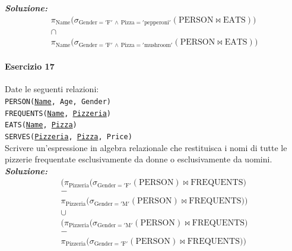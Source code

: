 \documentclass[12pt]{extarticle}
\begin{document}
\noindent \textbf{\textit{Soluzione:}}
\[
\begin{gathered}
\pi_{\text{Name}} \big( \sigma_{\text{Gender} = '\text{F}' \,\land\, \text{Pizza} = '\text{pepperoni}'}(\text{PERSON} \bowtie \text{EATS}) \big) \\
\cap \\
\pi_{\text{Name}} \big( \sigma_{\text{Gender} = '\text{F}' \,\land\, \text{Pizza} = '\text{mushroom}'}(\text{PERSON} \bowtie \text{EATS}) \big)
\end{gathered}
\]

\vspace{1em}

\paragraph{Esercizio 17} Date le seguenti relazioni:\\

\noindent \texttt{PERSON(\underline{Name}, Age, Gender)}\\
\texttt{FREQUENTS(\underline{Name}, \underline{Pizzeria})}\\
\texttt{EATS(\underline{Name}, \underline{Pizza})}\\
\texttt{SERVES(\underline{Pizzeria}, \underline{Pizza}, Price)}\\[0.5em]

\noindent Scrivere un'espressione in algebra relazionale che restituisca i nomi di tutte le pizzerie frequentate esclusivamente da donne o esclusivamente da uomini.\\

\noindent \textbf{\textit{Soluzione:}}
\[
\begin{gathered}
\Big( \pi_{\text{Pizzeria}} \big( \sigma_{\text{Gender} = '\text{F}'}(\text{PERSON}) \bowtie \text{FREQUENTS} \big) \\
- \\
\pi_{\text{Pizzeria}} \big( \sigma_{\text{Gender} = '\text{M}'}(\text{PERSON}) \bowtie \text{FREQUENTS} \big) \Big) \\
\cup \\
\Big( \pi_{\text{Pizzeria}} \big( \sigma_{\text{Gender} = '\text{M}'}(\text{PERSON}) \bowtie \text{FREQUENTS} \big) \\
- \\
\pi_{\text{Pizzeria}} \big( \sigma_{\text{Gender} = '\text{F}'}(\text{PERSON}) \bowtie \text{FREQUENTS} \big) \Big)
\end{gathered}
\]

\vspace{1em}
\end{document}
